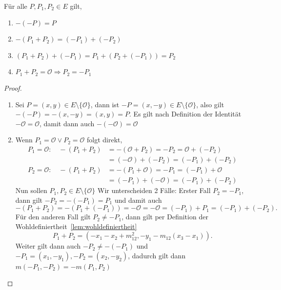 \begin{lemma}
    \label{lem:ass-hilfseigenschaften}
    Für alle $P,P_1,P_2\in E$ gilt,
    \begin{enumerate}[label=(\alph*)]
        \item \(-(-P)=P\)
        \item $-(P_1+P_2)=(-P_1)+(-P_2)$
        \item $(P_1+P_2)+(-P_1)=P_1+(P_2+(-P_1))=P_2$
        \item $P_1+P_2=\mathcal{O} \Rightarrow P_2=-P_1$
    \end{enumerate}
\end{lemma}

\begin{proof}
    \begin{enumerate}[label=(\alph*)]
        \item Sei $P=(x,y)\in E\setminus\{\mathcal{O}\}$, dann ist $-P=(x,-y)\in E\setminus\{\mathcal{O}\}$, also gilt $-(-P)=-(x,-y)=(x,y)=P$. Es gilt nach Definition der Identität $-\mathcal{O}=\mathcal{O}$, damit dann auch \(-(-\mathcal{O})=\mathcal{O}\)
        \item Wenn $P_1 =\mathcal{O}\lor P_2 =\mathcal{O}$ folgt direkt,
              \begin{align*}
                  P_1 =\mathcal{O}: \quad -(P_1+P_2) & =-(\mathcal{O}+P_2)=-P_2=\mathcal{O}+(-P_2) \\
                                                     & = (-\mathcal{O})+(-P_2)=(-P_1)+(-P_2)
              \end{align*}
              \begin{align*}
                  P_2 =\mathcal{O}: \quad -(P_1+P_2) & =-(P_1+\mathcal{O})=-P_1= (-P_1)+\mathcal{O} \\
                                                     & = (-P_1)+(-\mathcal{O})=(-P_1)+(-P_2)
              \end{align*}
              Nun sollen $P_1,P_2\in E \setminus\{\mathcal{O}\}$
              Wir unterscheiden 2 Fälle:
              Erster Fall $P_2=-P_1$, dann gilt $-P_2=-(-P_1)=P_1$ und damit auch
              \[
                  -(P_1+P_2)=-(P_1+(-P_1))=-\mathcal{O}=-\mathcal{O}= (-P_1)+P_1=(-P_1)+(-P_2).
              \]
              Für den anderen Fall gilt \(P_2\neq -P_1\), dann gilt per Definition der Wohldefiniertheit~\ref{lem:wohldefiniertheit}
              \[
                  P_1+P_2=(-x_1-x_2+m_{12}^2,-y_1-m_{12}(x_3-x_1)).
              \]
              Weiter gilt dann auch \(-P_2\neq-(-P_1)\) und \(-P_1=(x_1,-y_1),-P_2=(x_2,-y_2)\), dadurch gilt dann \(m(-P_1,-P_2)=-m(P_1,P_2)\)

\end{enumerate}
\end{proof}

